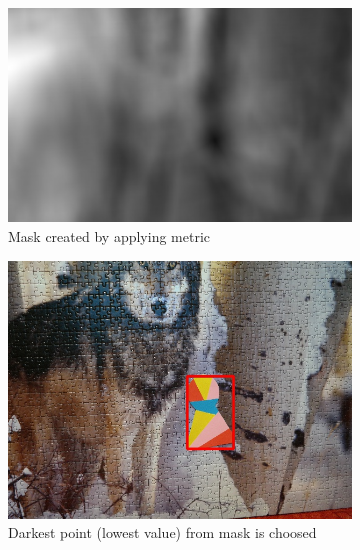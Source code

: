 \begin{figure}
\begin{subfigure}[t]{0.48\linewidth}
    \includegraphics[width=\linewidth]{img/pattern_matching/mask.jpg}
    \vspace{4mm}%
    \caption{Mask created by applying metric}
  \end{subfigure}
  \begin{subfigure}[t]{0.48\linewidth}
    \includegraphics[width=\linewidth]{img/pattern_matching/result-correct.jpg}
    \caption{Darkest point (lowest value) from mask is choosed}
  \end{subfigure}\\
  \begin{subfigure}[t]{0.48\linewidth}
    \vspace{-52mm}%

\end{subfigure}
\end{figure}

